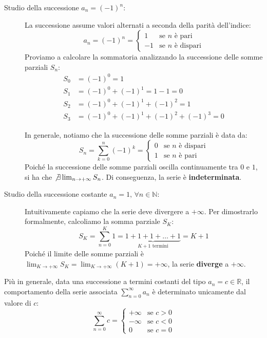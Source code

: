 \documentclass[12pt]{report}
\begin{document}
	\begin{description}
		
		\item[Studio della successione $a_n = (-1)^n$:] 
		La successione assume valori alternati a seconda della parità dell'indice:
		\[
		a_n = (-1)^n = 
		\begin{cases} 
			1 & \text{se } n \text{ è pari} \\ 
			-1 & \text{se } n \text{ è dispari} 
		\end{cases}
		\]
		Proviamo a calcolare la sommatoria analizzando la successione delle somme parziali $S_n$:
		\begin{align*}
			S_0 &= (-1)^0 = 1 \\
			S_1 &= (-1)^0 + (-1)^1 = 1 - 1 = 0 \\
			S_2 &= (-1)^0 + (-1)^1 + (-1)^2 = 1 \\
			S_3 &= (-1)^0 + (-1)^1 + (-1)^2 + (-1)^3 = 0 
		\end{align*}
		
		In generale, notiamo che la successione delle somme parziali è data da:
		\[
		S_n = \sum_{k=0}^{n} (-1)^k = 
		\begin{cases} 
			0 & \text{se } n \text{ è dispari} \\ 
			1 & \text{se } n \text{ è pari} 
		\end{cases}
		\]
		Poiché la successione delle somme parziali oscilla continuamente tra $0$ e $1$, si ha che $\not\exists \lim_{n \to +\infty} S_n$. Di conseguenza, la serie è \textbf{indeterminata}.
		
		\item[Studio della successione costante $a_n = 1, \, \forall n \in \mathbb{N}$:] 
		Intuitivamente capiamo che la serie deve divergere a $+\infty$. Per dimostrarlo formalmente, calcoliamo la somma parziale $S_K$:
		\[
		S_K = \sum_{n=0}^{K} 1 = \underbrace{1 + 1 + 1 + \dots + 1}_{K+1 \text{ termini}} = K + 1
		\]
		Poiché il limite delle somme parziali è $\lim_{K \to +\infty} S_K = \lim_{K \to +\infty} (K + 1) = +\infty$, la serie \textbf{diverge} a $+\infty$.
		
	\end{description}
	
	\begin{osservazione}{}{}
		
		Più in generale, data una successione a termini costanti del tipo $a_n = c \in \mathbb{R}$, il comportamento della serie associata $\sum_{n=0}^{\infty} a_n$ è determinato unicamente dal valore di $c$:
		\[
		\sum_{n=0}^{\infty} c = 
		\begin{cases} 
			+\infty & \text{se } c > 0 \\ 
			-\infty & \text{se } c < 0 \\ 
			0 & \text{se } c = 0 
		\end{cases}
		\]
		
	\end{osservazione}
	
\end{document}
